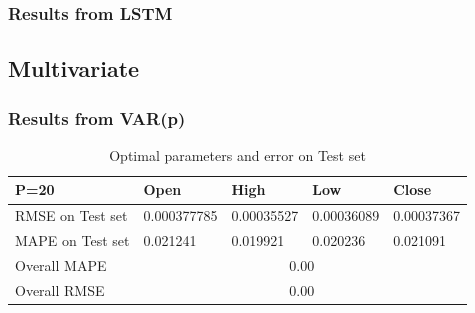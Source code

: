 \documentclass[11pt]{article}
\begin{document}
\subsubsection{Results from LSTM}

\subsection{Multivariate}
\subsubsection{Results from VAR(p)}
\begin{table}[H]
\begin{tabular}{|l|l|l|l|l|}
  \hline
  P=20             & Open        & High       & Low        & Close      \\ \hline
  RMSE on Test set & 0.000377785 & 0.00035527 & 0.00036089 & 0.00037367 \\ \hline
  MAPE on Test set & 0.021241    & 0.019921   & 0.020236   & 0.021091   \\ \hline
  Overall MAPE     & \multicolumn{4}{c|}{0.00}                          \\ \hline
  Overall RMSE     & \multicolumn{4}{c|}{0.00}                          \\ \hline
\end{tabular}
\caption{Optimal parameters and error on Test set}
\end{table}
\end{document}
